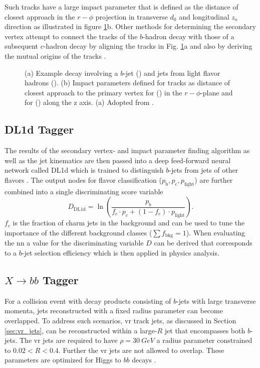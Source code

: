 Such tracks have a large impact parameter that is defined as the distance of closest approach in the $r-\phi$ projection in transverse $d_0$ and longitudinal $z_o$ direction \citep{aad2008atlas} as illustrated in figure \ref{fig:secondary_vertex}b. Other methods for determining the secondary vertex attempt to connect the tracks of the $b$-hadron decay with those of a subsequent $c$-hadron decay by aligning the tracks in Fig. \ref{fig:secondary_vertex}a and also by deriving the mutual origins of the tracks \citep{ATL-PHYS-PUB-2017-013}.
\begin{figure}[]
  \centering
  \caption{(a) Example decay involving a $b$-jet () and jets from light flavor hadrons (). (b) Impact parameters defined for tracks as distance of closest approach to the primary vertex for (\mbox{\color[HTML]{009245}{$d_0$}}) in the $r-\phi$-plane and for (\mbox{\color[HTML]{EC1C25}{$z_0$}}) along the z axis. (a) Adopted from \cite{Guth:2765038}.}
  \label{fig:secondary_vertex}
\end{figure}

\subsection{DL1d Tagger}
The results of the secondary vertex- and impact parameter finding algorithm as well as the jet kinematics are then passed into a deep feed-forward neural network called DL1d which is trained to distinguish $b$-jets from jets of other flavors \citep{atlas2022atlas}. The output nodes for flavor classification ($p_\mathrm{b}, p_\mathrm{c}, p_\mathrm{light}$) are further combined into a single discriminating score variable
\begin{equation}
  D_\mathrm{DL1d}=\ln\left(\frac{p_b}{f_c \cdot p_c + (1-f_c)\cdot p_\mathrm{light} }\right).
\end{equation}
$f_c$ is the fraction of charm jets in the background and can be used to tune the importance of the different background classes ($\sum f_\mathrm{bkg} =1$). When evaluating the \ac{nn} a value for the discriminating variable $D$ can be derived that corresponds to a $b$-jet selection efficiency which is then applied in physics analysis.

\subsection{$X\rightarrow bb$ Tagger}\label{sec:xbb}
For a collision event with decay products consisting of $b$-jets with large transverse momenta, jets reconstructed with a fixed radius parameter can become overlapped. To address such scenarios, \ac{vr} track jets, as discussed in Section \ref{sec:vr_jets}, can be reconstructed within a large-$R$ jet that encompasses both $b$-jets. The \ac{vr} jets are required to have $\rho=\qty[]{30}{GeV}$ a radius parameter constrained to $0.02 <R<0.4$. Further the \ac{vr} jets are not allowed to overlap. These parameters are optimized for Higgs to $bb$ decays \citep{ATL-PHYS-PUB-2017-010}.

